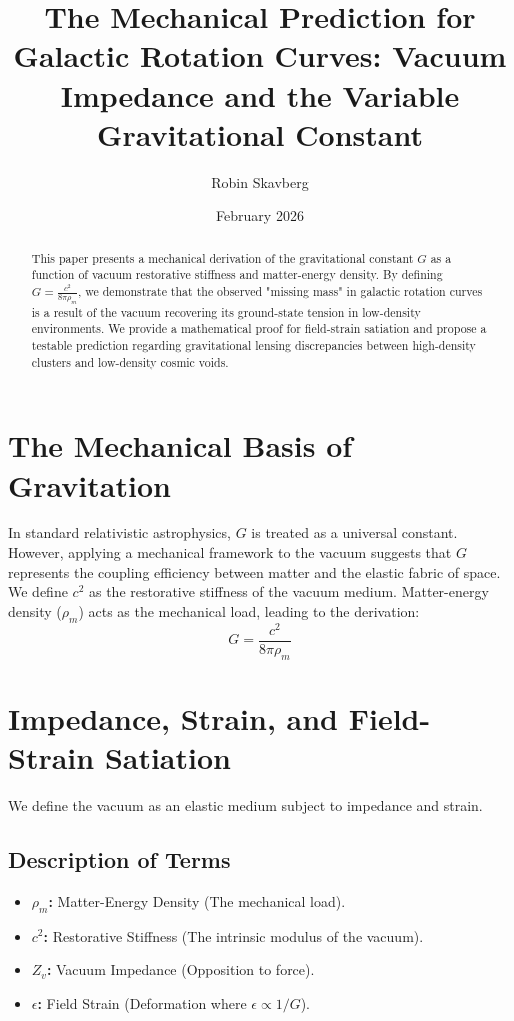 \documentclass[12pt,a4paper]{article}
\title{The Mechanical Prediction for Galactic Rotation Curves: Vacuum Impedance and the Variable Gravitational Constant}
\author{Robin Skavberg}
\date{February 2026}
\begin{document}
\maketitle

\begin{abstract}
This paper presents a mechanical derivation of the gravitational constant $G$ as a function of vacuum restorative stiffness and matter-energy density. By defining $G = \frac{c^2}{8\pi\rho_m}$, we demonstrate that the observed "missing mass" in galactic rotation curves is a result of the vacuum recovering its ground-state tension in low-density environments. We provide a mathematical proof for field-strain satiation and propose a testable prediction regarding gravitational lensing discrepancies between high-density clusters and low-density cosmic voids.
\end{abstract}

\section{The Mechanical Basis of Gravitation}
In standard relativistic astrophysics, $G$ is treated as a universal constant. However, applying a mechanical framework to the vacuum suggests that $G$ represents the coupling efficiency between matter and the elastic fabric of space. We define $c^2$ as the restorative stiffness of the vacuum medium. Matter-energy density ($\rho_m$) acts as the mechanical load, leading to the derivation:
\begin{equation}
G = \frac{c^2}{8\pi\rho_m}
\end{equation}

\section{Impedance, Strain, and Field-Strain Satiation}
We define the vacuum as an elastic medium subject to impedance and strain.

\subsection{Description of Terms}
\begin{itemize}
    \item \textbf{$\rho_m$:} Matter-Energy Density (The mechanical load).
    \item \textbf{$c^2$:} Restorative Stiffness (The intrinsic modulus of the vacuum).
    \item \textbf{$Z_v$:} Vacuum Impedance (Opposition to force).
    \item \textbf{$\epsilon$:} Field Strain (Deformation where $\epsilon \propto 1/G$).
\end{itemize}
\end{document}
